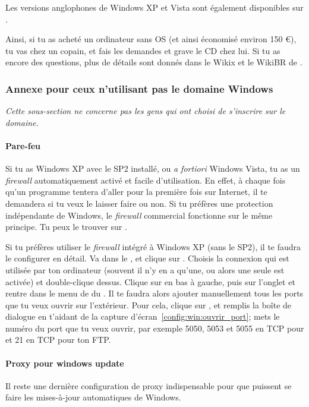 Les versions anglophones de Windows XP et Vista sont \'egalement disponibles sur .

Ainsi, si tu as achet\'e un ordinateur sans OS (et ainsi \'economis\'e environ 150 \euro), tu vas chez un copain, et fais les demandes et grave le CD chez lui. Si tu as encore des questions, plus de d\'etails sont donn\'es dans le Wikix et le WikiBR de \fkz.


\subsubsection{Annexe pour ceux n'utilisant pas le domaine Windows}

\label{horsdomaine} \emph{Cette sous-section ne concerne pas les gens qui ont choisi de s'inscrire sur le domaine.}

\paragraph{Pare-feu} Si tu as Windows XP avec le SP2 install\'e, ou \emph{a fortiori}
Windows Vista, tu as un \emph{firewall} automatiquement activ\'e et facile d'utilisation. En effet, \`a chaque fois qu'un programme tentera d'aller pour
la premi\`ere fois sur Internet, il te demandera si tu veux le laisser faire ou non. Si tu pr\'ef\`eres une protection ind\'ependante de Windows, le
\emph{firewall} commercial  fonctionne sur le m\^eme principe. Tu peux le trouver sur \xshare.

Si tu pr\'ef\`eres utiliser le \emph{firewall} int\'egr\'e \`a Windows XP (sans le SP2), il te faudra le configurer en d\'etail. Va dans le ,
 et clique sur . Choisis la connexion qui est utilis\'ee par ton ordinateur (souvent il n'y en a qu'une, ou
alors une seule est activ\'ee) et double-clique dessus. Clique sur  en bas \`a gauche, puis sur l'onglet  et rentre dans le
menu de  du . Il te faudra alors ajouter manuellement tous les ports que tu veux ouvrir sur l'ext\'erieur. Pour
cela, clique sur , et remplis la bo\^ite de dialogue en t'aidant de la capture d'\'ecran~\ref{config:win:ouvrir_port}; mets le num\'ero du
port que tu veux ouvrir, par exemple 5050, 5053 et 5055 en TCP pour  et 21 en TCP pour ton FTP.

\paragraph{Proxy pour windows update} Il reste une derni\`ere configuration de
proxy indispensable pour que puissent se faire les mises-\`a-jour automatiques
de Windows.

